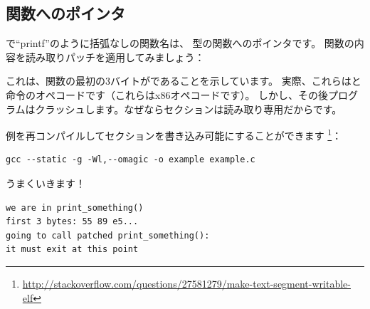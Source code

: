 \subsection{関数へのポインタ}

\CCpp{}で``printf''のように括弧なしの関数名は、 型の関数へのポインタです。
関数の内容を読み取りパッチを適用してみましょう：



これは、関数の最初の3バイトがであることを示しています。
実際、これらはと命令のオペコードです（これらはx86オペコードです）。
しかし、その後プログラムはクラッシュします。なぜならセクションは読み取り専用だからです。

例を再コンパイルしてセクションを書き込み可能にすることができます
\footnote{\url{http://stackoverflow.com/questions/27581279/make-text-segment-writable-elf}}：

\begin{lstlisting}
gcc --static -g -Wl,--omagic -o example example.c
\end{lstlisting}

うまくいきます！

\begin{lstlisting}
we are in print_something()
first 3 bytes: 55 89 e5...
going to call patched print_something():
it must exit at this point
\end{lstlisting}